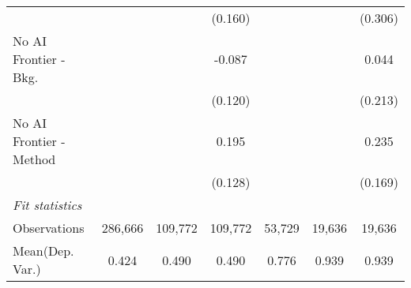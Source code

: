 \begin{tabular}{lcccccc}
                           &              &              & (0.160)      &              &         & (0.306)\\   
   No AI Frontier - Bkg.   &              &              & -0.087       &              &         & 0.044\\   
                           &              &              & (0.120)      &              &         & (0.213)\\   
   No AI Frontier - Method &              &              & 0.195        &              &         & 0.235\\   
                           &              &              & (0.128)      &              &         & (0.169)\\   
   \midrule
   \emph{Fit statistics}\\
   Observations            & 286,666      & 109,772      & 109,772      & 53,729       & 19,636  & 19,636\\  
Mean(Dep. Var.) & 0.424 & 0.490 & 0.490 & 0.776 & 0.939 & 0.939 \\
   

\end{tabular}
